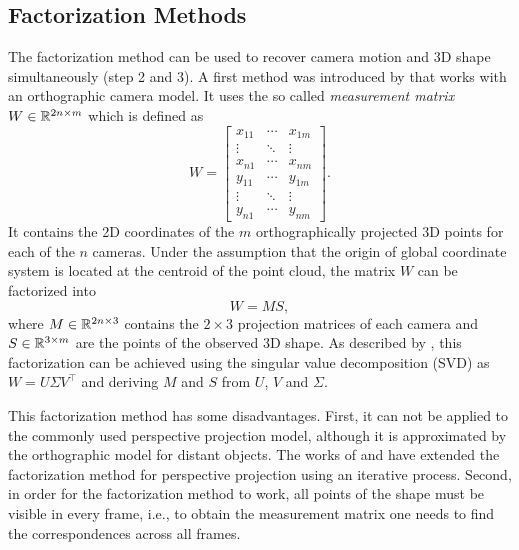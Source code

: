 			
			
	\subsection{Factorization Methods}
		The factorization method can be used to recover camera motion and 3D shape simultaneously (step 2 and 3).
		A first method was introduced by \cite{tomasi1992factorization} that works with an orthographic camera model.
		It uses the so called \emph{measurement matrix} $W \in \mathbb{R}^{2n \times m}$ which is defined as
		\begin{equation}\label{eq:measurement_matrix}
			W =
			\begin{bmatrix}
				x_{11} & \cdots & x_{1m} \\ 
				\vdots & \ddots & \vdots \\ 
				x_{n1} & \cdots & x_{nm} \\ 
				y_{11} & \cdots & y_{1m} \\ 
				\vdots & \ddots & \vdots \\ 
				y_{n1} & \cdots & y_{nm}
			\end{bmatrix}. 
		\end{equation}
		It contains the 2D coordinates of the $m$ orthographically projected 3D points for each of the $n$ cameras.
		Under the assumption that the origin of global coordinate system is located at the centroid of the point cloud, the matrix $W$ can be factorized into
		\begin{equation}\label{eq:factorization_method}
			W = MS,
		\end{equation}
		where $M \in \mathbb{R}^{2n \times 3}$ contains the $2 \times 3$ projection matrices of each camera and $S \in \mathbb{R}^{3 \times m}$  are the points of the observed 3D shape.
		As described by \cite{tomasi1992factorization}, this factorization can be achieved using the singular value decomposition (SVD) as $W = U \varSigma V^\top$ and deriving $M$ and $S$ from $U$, $V$ and $\varSigma$.
		
		This factorization method has some disadvantages.
		First, it can not be applied to the commonly used perspective projection model, although it is approximated by the orthographic model for distant objects.
		The works of \cite{sturm1996factorization} and \cite{christy1996euclidean} have extended the factorization method for perspective projection using an iterative process.
		Second, in order for the factorization method to work, all points of the shape must be visible in every frame, i.e., to obtain the measurement matrix one needs to find the correspondences across all frames.
		
